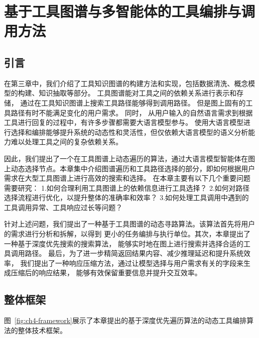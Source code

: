 \chapter{基于工具图谱与多智能体的工具编排与调用方法}

\section{引言}
\label{sec:intro}

\indent 在第三章中，我们介绍了工具知识图谱的构建方法和实现，包括数据清洗、概念模型的构建、知识抽取等部分。
工具图谱能对工具之间的依赖关系进行表示和存储，
通过在工具知识图谱上搜索工具路径能够得到调用路径。
但是图上固有的工具路径有时不能满足变化的用户需求。
同时，
从用户输入的自然语言需求到根据工具进行回复的过程中，有许多步骤都需要大语言模型参与。
使用大语言模型进行选择和编排能够提升系统的动态性和灵活性，但仅依赖大语言模型的语义分析能力难以处理工具之间的复杂依赖关系。

因此，我们提出了一个在工具图谱上动态遍历的算法，通过大语言模型智能体在图上动态选择节点。本章集中介绍图谱遍历和工具路径选择的部分，即如何根据用户需求在大型工具图谱上进行高效的搜索和选择。
在本章主要有以下几个重要问题需要研究：
1.如何合理利用工具图谱上的依赖信息进行工具选择？
2.如何对路径选择流程进行优化，以提升整体的准确率和效率？
3.如何处理工具调用中遇到的工具调用异常、工具响应过长等问题？

\indent 针对上述问题，我们提出了一种基于工具图谱的动态寻路算法。该算法首先将用户的需求进行分析和拆解，以得到
更小的任务编排与执行单位。其次，本章提出了一种基于深度优先搜索的搜索算法，
能够实时地在图上进行搜索并选择合适的工具调用路径。
最后，为了进一步精简返回结果内容、减少推理延迟和提升系统效率，
我们提出了一种响应压缩方法，通过让模型选择与用户需求有关的字段来生成压缩后的响应结果，
能够有效保留重要信息并提升交互效率。

\section{整体框架}

图~\ref{fig:ch4-framework}展示了本章提出的基于深度优先遍历算法的动态工具编排算法的整体技术框架。

